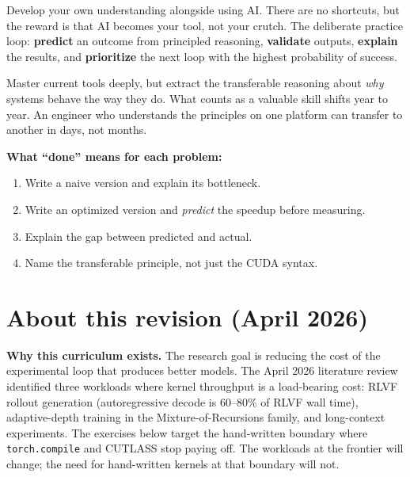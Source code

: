 \documentclass[11pt, letterpaper]{article}
\begin{document}
\begin{principle}
Develop your own understanding alongside using AI. There are no shortcuts, but the reward is that AI becomes your tool, not your crutch. The deliberate practice loop: \textbf{predict} an outcome from principled reasoning, \textbf{validate} outputs, \textbf{explain} the results, and \textbf{prioritize} the next loop with the highest probability of success.
\end{principle}

\begin{principle}
Master current tools deeply, but extract the transferable reasoning about \emph{why} systems behave the way they do. What counts as a valuable skill shifts year to year. An engineer who understands the principles on one platform can transfer to another in days, not months.
\end{principle}

\vfill
\begin{tastebox}
\textbf{What ``done'' means for each problem:}
\begin{enumerate}
\item Write a naive version and explain its bottleneck.
\item Write an optimized version and \emph{predict} the speedup before measuring.
\item Explain the gap between predicted and actual.
\item Name the transferable principle, not just the CUDA syntax.
\end{enumerate}
\end{tastebox}

\newpage
\setcounter{tocdepth}{1}
\tableofcontents

\newpage
\section*{About this revision (April 2026)}

\textbf{Why this curriculum exists.} The research goal is reducing the cost of the experimental loop that produces better models. The April 2026 literature review identified three workloads where kernel throughput is a load-bearing cost: RLVF rollout generation (autoregressive decode is 60--80\% of RLVF wall time), adaptive-depth training in the Mixture-of-Recursions family, and long-context experiments. The exercises below target the hand-written boundary where \texttt{torch.compile} and CUTLASS stop paying off. The workloads at the frontier will change; the need for hand-written kernels at that boundary will not.
\end{document}
